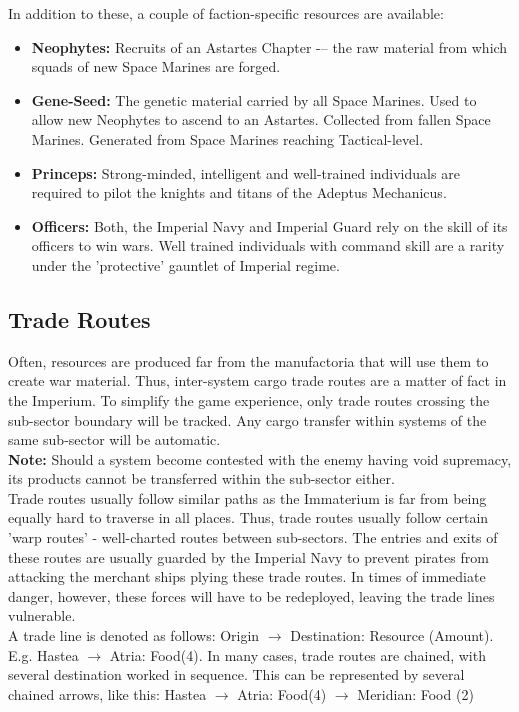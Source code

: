 In addition to these, a couple of faction-specific resources are available: 
\begin{itemize} 
    \item \textbf{Neophytes:} Recruits of an Astartes Chapter -– the raw material from which squads of new Space Marines are forged. 
    \item \textbf{Gene-Seed:} The genetic material carried by all Space Marines. Used to allow new Neophytes to ascend to an Astartes. Collected from fallen Space Marines. Generated from Space Marines reaching Tactical-level.
    \item \textbf{Princeps:} Strong-minded, intelligent and well-trained individuals are required to pilot the knights and titans of the Adeptus Mechanicus. 
    \item \textbf{Officers:} Both, the Imperial Navy and Imperial Guard rely on the skill of its officers to win wars. Well trained individuals with command skill are a rarity under the 'protective' gauntlet of Imperial regime.
\end{itemize} 

\subsection{Trade Routes} \label{trade_routes}
Often, resources are produced far from the manufactoria that will use them to create war material. Thus, inter-system cargo trade routes are a matter of fact in the Imperium. To simplify the game experience, only trade routes crossing the sub-sector boundary will be tracked. Any cargo transfer within systems of the same sub-sector will be automatic. \\ 
\textbf{Note:} Should a system become contested with the enemy having void supremacy, its products cannot be transferred within the sub-sector either. \newline
\\
Trade routes usually follow similar paths as the Immaterium is far from being equally hard to traverse in all places. Thus, trade routes usually follow certain 'warp routes' - well-charted routes between sub-sectors. The entries and exits of these routes are usually guarded by the Imperial Navy to prevent pirates from attacking the merchant ships plying these trade routes. In times of immediate danger, however, these forces will have to be redeployed, leaving the trade lines vulnerable.  \\
A trade line is denoted as follows: Origin $\rightarrow$ Destination: Resource (Amount). E.g. Hastea $\rightarrow$ Atria: Food(4). 
In many cases, trade routes are chained, with several destination worked in sequence. This can be represented by several chained arrows, like this: Hastea $\rightarrow$ Atria: Food(4) $\rightarrow$ Meridian: Food (2)

